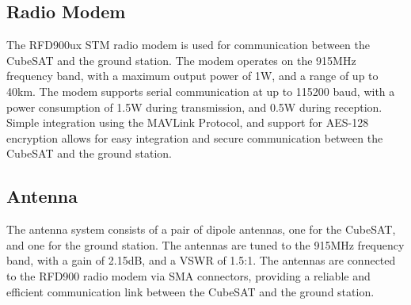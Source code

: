 \documentclass{report}
\begin{document}
            \subsection{Radio Modem}
                The RFD900ux STM radio modem is used for communication between the CubeSAT and the ground station.
                The modem operates on the 915MHz frequency band, with a maximum output power of 1W, and a range of up to 40km.
                The modem supports serial communication at up to 115200 baud, with a power consumption of 1.5W during transmission,
                and 0.5W during reception.
                Simple integration using the MAVLink Protocol, and 
                support for AES-128 encryption allows for easy integration and secure communication between the CubeSAT and the ground station.
            \subsection{Antenna}
                The antenna system consists of a pair of dipole antennas, one for the CubeSAT, and one for the ground station.
                The antennas are tuned to the 915MHz frequency band, with a gain of 2.15dB, and a VSWR of 1.5:1.
                The antennas are connected to the RFD900 radio modem via SMA connectors, providing a reliable and efficient
                communication link between the CubeSAT and the ground station.
\end{document}
